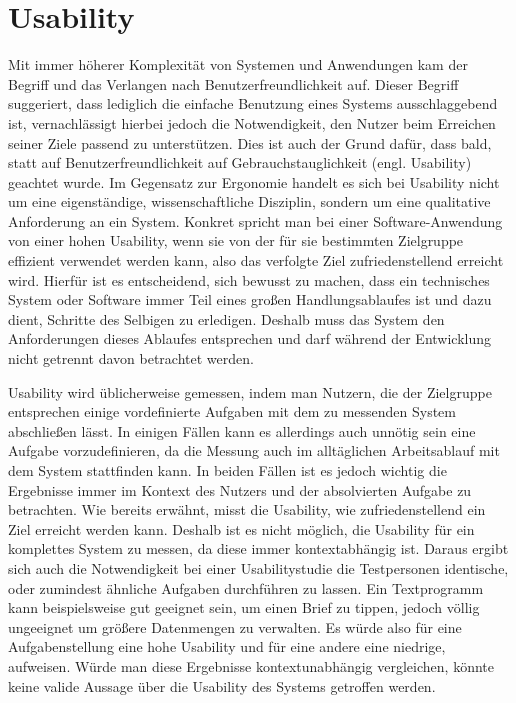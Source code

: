 \section{Usability}
Mit immer höherer Komplexität von Systemen und Anwendungen kam der Begriff und das Verlangen nach  \glqq Benutzerfreundlichkeit\grqq{} auf.
Dieser Begriff suggeriert, dass lediglich die einfache Benutzung eines Systems ausschlaggebend ist, vernachlässigt hierbei jedoch die Notwendigkeit, den Nutzer beim Erreichen seiner Ziele passend zu unterstützen.
Dies ist auch der Grund dafür, dass bald, statt auf \glqq Benutzerfreundlichkeit\grqq{}  auf \glqq Gebrauchstauglichkeit\grqq{}  (engl. Usability) geachtet wurde.
Im Gegensatz zur Ergonomie handelt es sich bei Usability nicht um eine eigenständige, wissenschaftliche Disziplin, sondern um eine qualitative Anforderung an ein System\cite{Sarodnick.2016}.
Konkret spricht man bei einer Software-Anwendung von einer hohen Usability, wenn sie von der für sie bestimmten Zielgruppe effizient verwendet werden kann, also das verfolgte Ziel zufriedenstellend erreicht wird\cite{Richter.2016}.
Hierfür ist es entscheidend, sich bewusst zu machen, dass ein technisches System oder Software immer Teil eines großen Handlungsablaufes ist und dazu dient, Schritte des Selbigen zu erledigen.
Deshalb muss das System den Anforderungen dieses Ablaufes entsprechen und darf während der Entwicklung nicht getrennt davon betrachtet werden\cite{Sarodnick.2016}.

Usability wird üblicherweise gemessen, indem man Nutzern, die der Zielgruppe entsprechen einige vordefinierte Aufgaben mit dem zu messenden System abschließen lässt. 
In einigen Fällen kann es allerdings auch unnötig sein eine Aufgabe vorzudefinieren, da die Messung auch im alltäglichen Arbeitsablauf mit dem System stattfinden kann.
In beiden Fällen ist es jedoch wichtig die Ergebnisse immer im Kontext des Nutzers und der absolvierten Aufgabe zu betrachten\cite{Nielsen.1995?}. 
Wie bereits erwähnt, misst die Usability, wie zufriedenstellend ein Ziel erreicht werden kann.
Deshalb ist es nicht möglich, die Usability für ein komplettes System zu messen, da diese immer kontextabhängig ist.
Daraus ergibt sich auch die Notwendigkeit bei einer Usabilitystudie die Testpersonen identische, oder zumindest ähnliche Aufgaben durchführen zu lassen.
Ein Textprogramm kann beispielsweise gut geeignet sein, um einen Brief zu tippen, jedoch völlig ungeeignet um größere Datenmengen zu verwalten. Es würde also für eine Aufgabenstellung eine hohe Usability und für eine andere eine niedrige, aufweisen. 
Würde man diese Ergebnisse kontextunabhängig vergleichen, könnte keine valide Aussage über die Usability des Systems getroffen werden.

